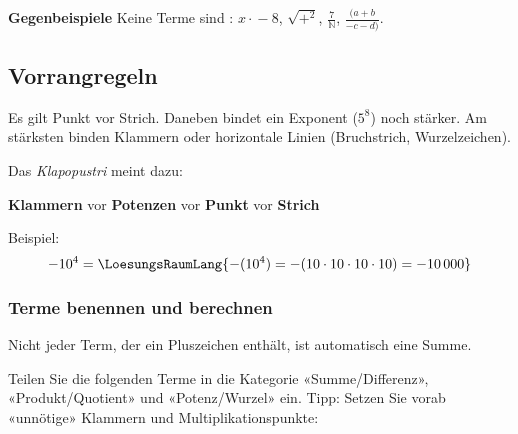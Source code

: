 \textbf{Gegenbeispiele}
Keine Terme sind \zB{}: $x \cdot{}-8$, $\sqrt{+^2}$, $\frac{7}{\mathbb{N}}$, $\frac{(a+b}{-c-d)}$.


\newpage

\subsection{Vorrangregeln}

Es gilt Punkt vor Strich. Daneben bindet ein Exponent (\zB $5^8$) noch
stärker. Am stärksten binden Klammern oder horizontale Linien
(Bruchstrich, Wurzelzeichen).

\begin{center}
  Das \textit{Klapopustri} meint dazu:

  \textbf{Klammern} vor \textbf{Potenzen} vor \textbf{Punkt} vor
  \textbf{Strich}
  
\end{center}




Beispiel:
$$-10^4 = \LoesungsRaumLang{-(10^4) = -
  (10\cdot{}10\cdot{}10\cdot{}10) = -10\,000}$$


\subsubsection{Terme benennen und berechnen}
Nicht jeder Term, der ein Pluszeichen enthält, ist automatisch eine
Summe.

Teilen Sie die folgenden Terme in die Kategorie «Summe/Differenz»,
«Produkt/Quotient» und «Potenz/Wurzel» ein. Tipp: Setzen Sie vorab
«unnötige» Klammern und Multiplikationspunkte:


